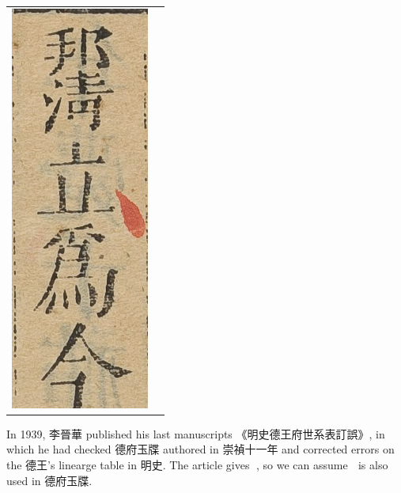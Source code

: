 \documentclass{article}
\begin{document}
\begin{center}
\begin{tabular}{ c c }
\includegraphics{20002484.png-1-crop.png}
    \end{tabular}
    \label{mingshanzang}
\end{center}

In 1939, 李晉華 published his last manuscripts 《明史德王府世系表訂誤》\cite{明史德王府世系表訂誤}, in which he had checked 德府玉牒 authored in 崇禎十一年 and corrected errors on the 德王's linearge table in 明史. The article gives 﫡, so we can assume 﫠 is also used in 德府玉牒.
\end{document}
